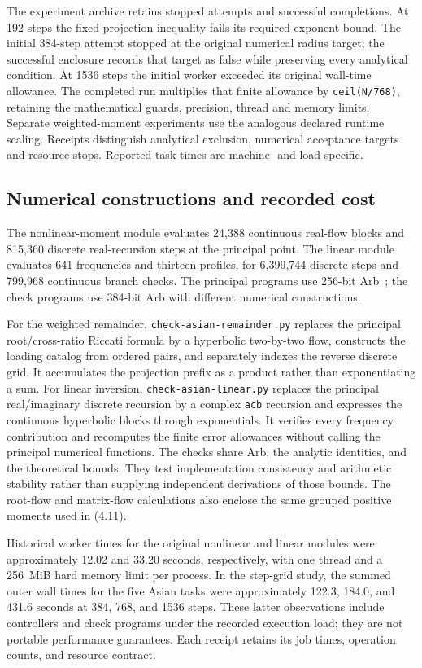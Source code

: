 The experiment archive retains stopped attempts and successful completions.
At 192 steps the fixed projection inequality fails its required exponent bound.
The initial 384-step attempt stopped at the original numerical radius target;
the successful enclosure records that target as false while preserving every
analytical condition. At 1536 steps the initial worker exceeded its original
wall-time allowance. The completed run multiplies that finite allowance by
\texttt{ceil(N/768)}, retaining the mathematical guards, precision, thread and
memory limits. Separate weighted-moment experiments use the analogous declared
runtime scaling. Receipts distinguish analytical exclusion, numerical acceptance
targets and resource stops. Reported task times are machine- and load-specific.


\subsection{Numerical constructions and recorded cost}


The nonlinear-moment module evaluates 24,388 continuous real-flow blocks and
815,360 discrete real-recursion steps at the principal point. The linear module
evaluates 641 frequencies and thirteen profiles, for 6,399,744 discrete steps
and 799,968 continuous branch checks. The principal programs use 256-bit
Arb~\cite{Johansson2017}; the check programs use 384-bit Arb with different
numerical constructions.

For the weighted remainder, \texttt{check-asian-remainder.py} replaces the
principal root/cross-ratio Riccati formula by a hyperbolic two-by-two flow,
constructs the loading catalog from ordered pairs, and separately indexes the
reverse discrete grid. It accumulates the projection prefix as a product rather
than exponentiating a sum. For linear inversion,
\texttt{check-asian-linear.py} replaces the principal real/imaginary discrete
recursion by a complex \texttt{acb} recursion and expresses the continuous
hyperbolic blocks through exponentials. It verifies every frequency contribution
and recomputes the finite error allowances without calling the principal
numerical functions. The checks share Arb, the analytic identities, and the
theoretical bounds. They test implementation consistency and arithmetic
stability rather than supplying independent derivations of those bounds.
The root-flow and matrix-flow calculations also enclose the same grouped
positive moments used in (4.11).

Historical worker times for the original nonlinear and linear modules were
approximately 12.02 and 33.20 seconds, respectively, with one thread and a
256~MiB hard memory limit per process. In the step-grid study, the summed
outer wall times for the five Asian tasks were approximately 122.3, 184.0,
and 431.6 seconds at 384, 768, and 1536 steps. These latter observations
include controllers and check programs under the recorded execution load;
they are not portable performance guarantees. Each receipt retains its job
times, operation counts, and resource contract.



